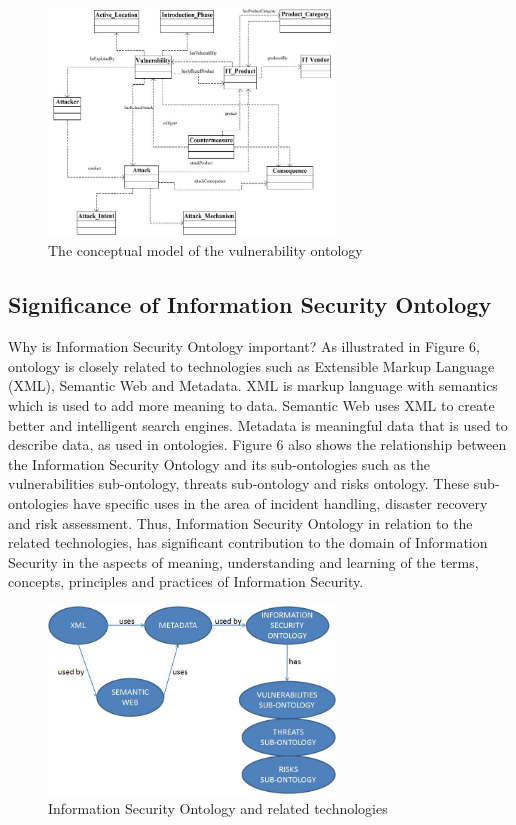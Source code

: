\documentclass[conference, compsoc]{IEEEtran}
\begin{document}
\begin{figure}[!t]
\centering
\includegraphics[width=3.0in]{ovm}
\caption{The conceptual model of the vulnerability ontology}
\label{ovm}
\end{figure}

\subsection{Significance of Information Security Ontology}
Why is Information Security Ontology important? As illustrated in Figure 6, ontology is closely related to technologies such as Extensible Markup Language (XML), Semantic Web and Metadata. XML is markup language with semantics which is used to add more meaning to data. Semantic Web uses XML to create better and intelligent search engines. Metadata is meaningful data that is used to describe data, as used in ontologies. Figure 6 also shows the relationship between the Information Security Ontology and its sub-ontologies such as the vulnerabilities sub-ontology, threats sub-ontology and risks ontology. These sub-ontologies have specific uses in the area of incident handling, disaster recovery and risk assessment. Thus, Information Security Ontology in relation to the related technologies, has significant contribution to the domain of Information Security in the aspects of meaning, understanding and learning of the terms, concepts, principles and practices of Information Security. 

\begin{figure}[!t]
\centering
\includegraphics[width=3.0in]{DiagraphISOntology}
\caption{Information Security Ontology and related technologies}
\label{DiagraphISOntology}
\end{figure}
\end{document}
